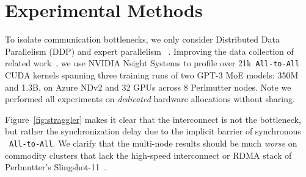 
\section{Experimental Methods}\label{sec:experimental_methods}
To isolate communication bottlenecks, we only consider Distributed Data Parallelism (DDP) and expert parallelism
~\cite{DBLP:journals/corr/abs-2006-16668}.
Improving the data collection of related work~\cite{288705},
we use NVIDIA Nsight Systems to profile over 21k~\verb|All-to-All| CUDA kernels spanning three training runs of two
GPT-3 MoE models: 350M and 1.3B, on Azure NDv2 and 32 GPUs across 8 Perlmutter nodes.
Note we performed all experiments on \emph{dedicated} hardware allocations without sharing.

Figure~\ref{fig:straggler} makes it clear that the interconnect is not the bottleneck,
but rather the synchronization delay due to the implicit barrier of synchronous ~\verb|All-to-All|.
We clarify that the multi-node results should be much \emph{worse} on commodity clusters that lack
the high-speed interconnect or RDMA stack of Perlmutter's Slingshot-11~\cite{Khorassani2023}.
